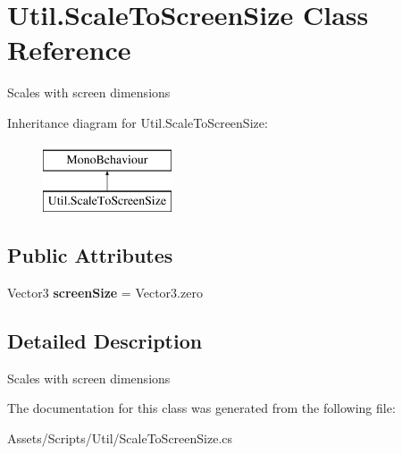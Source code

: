 \hypertarget{class_util_1_1_scale_to_screen_size}{}\section{Util.\+Scale\+To\+Screen\+Size Class Reference}
\label{class_util_1_1_scale_to_screen_size}


Scales with screen dimensions  


Inheritance diagram for Util.\+Scale\+To\+Screen\+Size\+:\begin{figure}[H]
\begin{center}
\leavevmode
\includegraphics[height=2.000000cm]{class_util_1_1_scale_to_screen_size}
\end{center}
\end{figure}
\subsection*{Public Attributes}
\begin{DoxyCompactItemize}
\item 
Vector3 {\bfseries screen\+Size} = Vector3.\+zero\hypertarget{class_util_1_1_scale_to_screen_size_a6f655c842d9d499f6104a84e8567dbdf}{}\label{class_util_1_1_scale_to_screen_size_a6f655c842d9d499f6104a84e8567dbdf}

\end{DoxyCompactItemize}


\subsection{Detailed Description}
Scales with screen dimensions 



The documentation for this class was generated from the following file\+:\begin{DoxyCompactItemize}
\item 
Assets/\+Scripts/\+Util/Scale\+To\+Screen\+Size.\+cs\end{DoxyCompactItemize}
